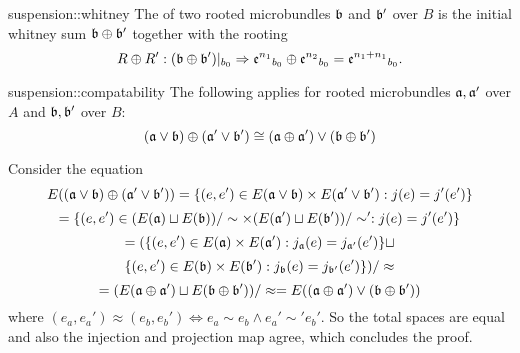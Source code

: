 \begin{mydefinition}{suspension::whitney}
    The  of two rooted microbundles $\bb$ and $\bb'$ over $B$
    is the initial whitney sum $\whitney{\bb}{\bb'}$ together with the rooting
    \[ \germdef{\whitney{R}{R'}}{(\whitney{\bb}{\bb'})\restr{b_0}}{\whitney{\be[n_1]{}_{b_0}}{\be[n_2]{}_{b_0}} = \be[n_1 + n_1]{}_{b_0}}. \]
\end{mydefinition}

\begin{mylemma}{suspension::compatability}   
    The following applies for rooted microbundles $\ba, \ba'$ over $A$ and $\bb, \bb'$ over $B$: 
    \[ \whitney{(\ba \vee \bb)}{(\ba' \vee \bb')} \cong (\whitney{\ba}{\ba'}) \vee (\whitney{\bb}{\bb'}) \]
\end{mylemma}
\begin{myproof}
    Consider the equation
    \[ E(\whitney{(\ba \vee \bb)}{(\ba' \vee \bb')}) = \set{(e, e') \in E(\ba \vee \bb) \times E(\ba' \vee \bb')}{j(e) = j'(e')} \]
    \[ = \set{(e, e') \in (E(\ba) \sqcup E(\bb)) / \sim \times (E(\ba') \sqcup E(\bb')) / \sim'}{j(e) = j'(e')} \]
    \[ = (\set{(e, e') \in E(\ba) \times E(\ba')}{j_\ba(e) = j_{\ba'}(e')} \sqcup \]
    \[ \set{(e, e') \in E(\bb) \times E(\bb')}{j_\bb(e) = j_{\bb'}(e')}) / \approx \]
    \[ = (E(\whitney{\ba}{\ba'}) \sqcup E(\whitney{\bb}{\bb'})) / \approx = E((\whitney{\ba}{\ba'}) \vee (\whitney{\bb}{\bb'}))\]
    where $(e_a, e_a') \approx (e_b, e_b') \iff e_a \sim e_b \land e_a' \sim' e_b'$.
    So the total spaces are equal and also the injection and projection map agree, which concludes the proof.
\end{myproof}